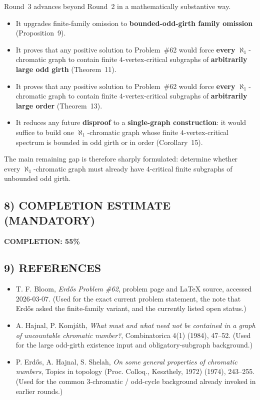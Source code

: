 Round~3 advances beyond Round~2 in a mathematically substantive way.
\begin{itemize}
\item It upgrades finite-family omission to \textbf{bounded-odd-girth family omission} (Proposition~9).
\item It proves that any positive solution to Problem~\#62 would force \textbf{every} $\aleph_1$-chromatic graph to contain finite $4$-vertex-critical subgraphs of \textbf{arbitrarily large odd girth} (Theorem~11).
\item It proves that any positive solution to Problem~\#62 would force \textbf{every} $\aleph_1$-chromatic graph to contain finite $4$-vertex-critical subgraphs of \textbf{arbitrarily large order} (Theorem~13).
\item It reduces any future \textbf{disproof} to a \textbf{single-graph construction}: it would suffice to build one $\aleph_1$-chromatic graph whose finite $4$-vertex-critical spectrum is bounded in odd girth or in order (Corollary~15).
\end{itemize}
The main remaining gap is therefore sharply formulated: determine whether every $\aleph_1$-chromatic graph must already have $4$-critical finite subgraphs of unbounded odd girth.

\subsection*{8) COMPLETION ESTIMATE (MANDATORY)}
\textbf{COMPLETION: 55\%}

\subsection*{9) REFERENCES}
\begin{itemize}
\item T. F. Bloom, \emph{Erd\H{o}s Problem \#62}, problem page and LaTeX source, accessed 2026-03-07. (Used for the exact current problem statement, the note that Erd\H{o}s asked the finite-family variant, and the currently listed open status.)
\item A. Hajnal, P. Komj\'ath, \emph{What must and what need not be contained in a graph of uncountable chromatic number?}, Combinatorica 4(1) (1984), 47--52. (Used for the large odd-girth existence input and obligatory-subgraph background.)
\item P. Erd\H{o}s, A. Hajnal, S. Shelah, \emph{On some general properties of chromatic numbers}, Topics in topology (Proc. Colloq., Keszthely, 1972) (1974), 243--255. (Used for the common $3$-chromatic / odd-cycle background already invoked in earlier rounds.)
\end{itemize}
